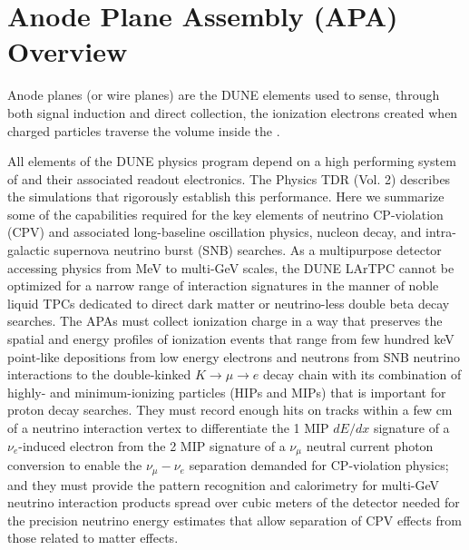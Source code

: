 \section{Anode Plane Assembly (APA) Overview}
\label{sec:fdsp-apa-intro}

Anode planes (or wire planes) are the DUNE  elements used to sense, through both signal induction and direct collection, the ionization electrons created when charged particles traverse the \lar volume inside the . 

All elements of the DUNE physics program depend on a high performing system of  and their associated readout electronics.  The Physics TDR (Vol. 2) describes the simulations that rigorously establish this performance.  Here we summarize some of the  capabilities required for the key elements of neutrino CP-violation (CPV) and associated long-baseline oscillation physics, nucleon decay, and intra-galactic supernova neutrino burst (SNB) searches.  As a multipurpose detector accessing physics from MeV to multi-GeV scales, the DUNE LArTPC cannot be optimized for a narrow range of interaction signatures in the manner of noble liquid TPCs dedicated to direct dark matter or neutrino-less double beta decay searches.  The APAs must collect ionization charge in a way that preserves the spatial and energy profiles of ionization events that range from few hundred keV point-like depositions from low energy electrons and neutrons  from SNB neutrino interactions to the double-kinked $K\rightarrow\mu\rightarrow{e}$ decay chain with its combination of highly- and minimum-ionizing particles (HIPs and MIPs) that is important for proton decay searches.  They must record enough hits on tracks within a few cm of a neutrino interaction vertex to differentiate the 1 MIP $dE/dx$ signature of a $\nu_e$-induced electron from the 2 MIP signature of a $\nu_\mu$ neutral current photon conversion to enable the $\nu_\mu-\nu_e$ separation demanded for CP-violation physics; and they must provide the pattern recognition and calorimetry for multi-GeV neutrino interaction products  spread over cubic meters of the detector needed for the precision neutrino energy estimates that allow separation of CPV effects from those related to matter effects. 
 
